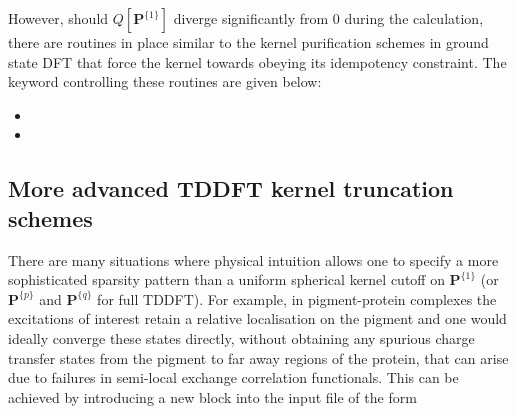 \documentclass[letterpaper,10pt,english]{sphinxmanual}
\begin{document}
However, should \(Q\left[\textbf{P}^{\{1\}}\right]\) diverge
significantly from 0 during the calculation, there are routines in place
similar to the kernel purification schemes in ground state DFT that
force the kernel towards obeying its idempotency constraint. The keyword
controlling these routines are given below:
\begin{itemize}
\item {} 

\item {} 

\end{itemize}


\subsection{More advanced TDDFT kernel truncation schemes}
\label{\detokenize{lr_tddft:more-advanced-tddft-kernel-truncation-schemes}}
\begin{DUlineblock}{0em}
\item[] There are many situations where physical intuition allows one to
specify a more sophisticated sparsity pattern than a uniform spherical
kernel cutoff on \(\textbf{P}^{\{1\}}\) (or
\(\textbf{P}^{\{p\}}\) and \(\textbf{P}^{\{q\}}\) for full
TDDFT). For example, in pigment-protein complexes the excitations of
interest retain a relative localisation on the pigment and one would
ideally converge these states directly, without obtaining any spurious
charge transfer states from the pigment to far away regions of the
protein, that can arise due to failures in semi-local exchange
correlation functionals. This can be achieved by introducing a new
block into the input file of the form
\end{DUlineblock}
\end{document}
